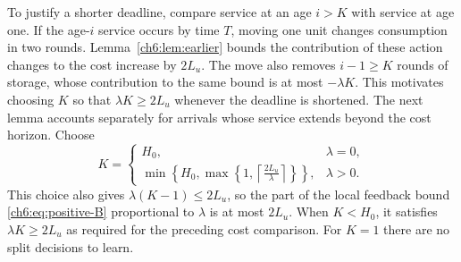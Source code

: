 \documentclass[11pt]{article}
\theoremstyle{plain}
\theoremstyle{remark}
\numberwithin{equation}{section}
\begin{document}
To justify a shorter deadline, compare service at an age $i>K$ with
service at age one. If the age-$i$ service occurs by time $T$, moving one
unit changes consumption in two rounds. Lemma~\ref{ch6:lem:earlier} bounds
the contribution of these action changes to the cost increase by $2L_u$.
The move also removes $i-1\ge K$ rounds of storage, whose contribution to
the same bound is at most $-\lambda K$. This motivates choosing $K$ so
that $\lambda K\ge2L_u$ whenever the deadline is shortened. The next lemma
accounts separately for arrivals whose service extends beyond the cost
horizon. Choose
\begin{equation}\label{ch6:eq:K}
 K=\begin{cases}
 H_0,&\lambda=0,\\[1mm]
 \displaystyle\min\left\{H_0,
 \max\left\{1,\left\lceil\frac{2L_u}{\lambda}\right\rceil\right\}\right\},
 &\lambda>0.
 \end{cases}
\end{equation}
This choice also gives $\lambda(K-1)\le2L_u$, so the part of the local
feedback bound \eqref{ch6:eq:positive-B} proportional to $\lambda$ is at
most $2L_u$. When $K<H_0$, it satisfies
$\lambda K\ge2L_u$ as required for the preceding cost comparison.
For $K=1$ there are no split decisions to learn.
\end{document}
